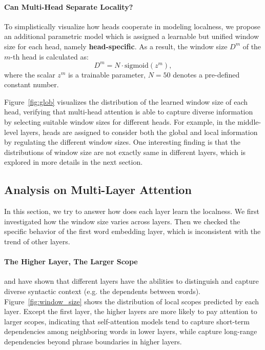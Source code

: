 \documentclass[11pt,a4paper]{article}
\begin{document}
\paragraph{Can Multi-Head Separate Locality?}

To simplistically visualize how heads cooperate in modeling localness, we propose an additional parametric model which is assigned a learnable but unified window size for each head, namely {\bf head-specific}. As a result, the window size $D^m$ of the $m$-th head is calculated as:
    \begin{equation}
     D^m = N\cdot \text{sigmoid}(z^m),
    \end{equation} 
where the scalar $z^m$ is a trainable parameter, $N=50$ denotes a pre-defined constant number. 

Figure~\ref{fig:glob} visualizes the distribution of the learned window size of each head, verifying that multi-head attention is able to capture diverse information by selecting suitable window sizes for different heads.
For example, in the middle-level layers, heads are assigned to consider both the global and local information by regulating the different window sizes. One interesting finding is that the distributions of window size are not exactly same in different layers, which is explored in more details in the next section.




\subsection{Analysis on Multi-Layer Attention}
\label{sec:multilayer}

In this section, we try to answer how does each layer learn the localness. We first investigated how the window size varies across layers. Then we checked the specific behavior of the first word embedding layer, which is inconsistent with the trend of other layers.

\paragraph{The Higher Layer, The Larger Scope}   and  have shown that different layers have the abilities to distinguish and capture diverse syntactic context (e.g. the dependents between words). Figure~\ref{fig:window_size} shows the distribution of local scopes predicted by each layer. Except the first layer, the higher layers are more likely to pay attention to larger scopes, indicating that self-attention models tend to capture short-term dependencies among neighboring words in lower layers, while capture long-range dependencies beyond phrase boundaries in higher layers.
\end{document}
